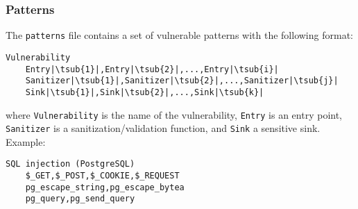 \subsubsection*{Patterns}
\label{sec:expr.comps.patterns}

The \verb|patterns| file contains a set of vulnerable patterns with the
following format:

\begin{lstlisting}[label={lst:pat.tmpl},
        caption={Vulnerable pattern template}]
    Vulnerability
    Entry|\tsub{1}|,Entry|\tsub{2}|,...,Entry|\tsub{i}|
    Sanitizer|\tsub{1}|,Sanitizer|\tsub{2}|,...,Sanitizer|\tsub{j}|
    Sink|\tsub{1}|,Sink|\tsub{2}|,...,Sink|\tsub{k}|
\end{lstlisting}

where \verb|Vulnerability| is the name of the vulnerability, \verb|Entry| is an
entry point, \verb|Sanitizer| is a sanitization/validation function, and
\verb|Sink| a sensitive sink. Example:

\begin{lstlisting}[label={lst:pat.ex},
        caption={SQL Injection pattern, specific to PostgreSQL}]
    SQL injection (PostgreSQL)
    $_GET,$_POST,$_COOKIE,$_REQUEST
    pg_escape_string,pg_escape_bytea
    pg_query,pg_send_query
\end{lstlisting}
